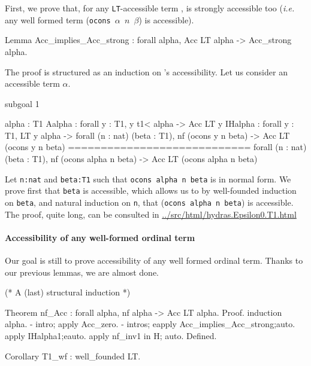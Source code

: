 \documentclass[a4paper]{book}
\begin{document}
First, we prove that, for  any \texttt{LT}-accessible term \showmath{\alpha}, \showmath{\alpha} is 
strongly accessible too (\emph{i.e.} any well formed
term (\texttt{ocons $\alpha$ $n$ $\beta$})  is accessible).

\begin{Coqsrc}
Lemma Acc_implies_Acc_strong : 
   forall alpha, Acc LT  alpha -> Acc_strong alpha.
\end{Coqsrc}


The proof is structured as an induction on \showmath{\alpha}'s accessibility. Let us consider
an accessible term $\alpha$.



\begin{Coqanswer}
  subgoal 1 

  alpha : T1
  Aalpha : forall y : T1,  y t1< alpha -> Acc LT y
  IHalpha : forall y : T1,
       LT y alpha ->
       forall (n : nat) (beta : T1),
       nf (ocons y n beta) -> Acc LT (ocons y n beta)
  ============================
   forall (n : nat) (beta : T1),
   nf (ocons alpha n beta) -> Acc LT (ocons alpha n beta)
\end{Coqanswer}

Let \texttt{n:nat} and \texttt{beta:T1} such that \texttt{ocons alpha n beta} is in normal form. 
We prove first that \texttt{beta} is accessible,  which allows us to by well-founded induction on \texttt{beta}, 
and natural induction on \texttt{n}, that (\texttt{ocons alpha n beta}) is accessible.
The proof, quite long, can be consulted in \url{../src/html/hydras.Epsilon0.T1.html} 

\paragraph{Accessibility of any well-formed ordinal term}
\label{sec:orgheadline80}

Our goal is still to prove accessibility of any well formed ordinal term.
Thanks to our previous lemmas, we are almost done.

\begin{Coqsrc}
(* A (last) structural induction *)

Theorem nf_Acc : forall alpha, nf alpha -> Acc LT  alpha.
Proof.
 induction alpha.
-  intro; apply Acc_zero.
 -  intros; eapply Acc_implies_Acc_strong;auto.
    apply IHalpha1;eauto.
    apply nf_inv1 in H; auto. 
Defined.

Corollary T1_wf : well_founded LT.
\end{Coqsrc}
\end{document}
